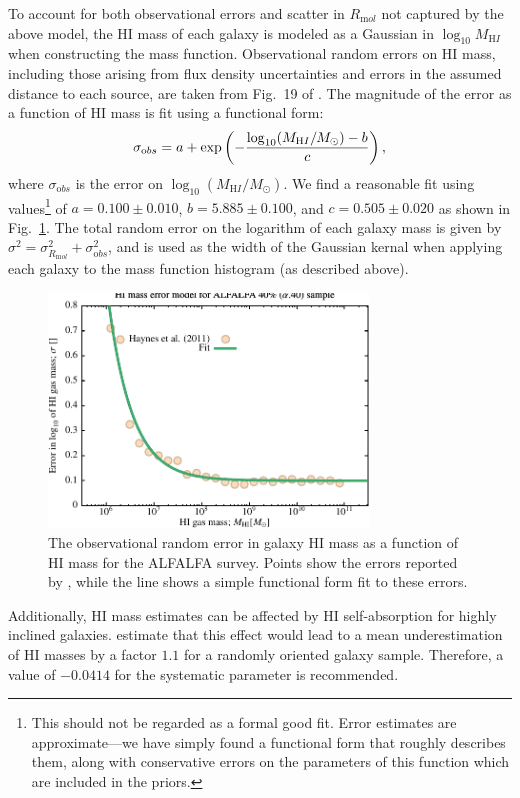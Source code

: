 To account for both observational errors and scatter in $R_{\mathrm mol}$ not captured by the above model, the HI mass of each galaxy is modeled as a Gaussian in $\log_{10}M_{\mathrm HI}$ when constructing the mass function. Observational random errors on HI mass, including those arising from flux density uncertainties and errors in the assumed distance to each source, are taken from Fig.~19 of \cite{haynes_arecibo_2011}. The magnitude of the error as a function of HI mass is fit using a functional form:
\begin{equation}
 \sigma_{\mathrm obs} = a + \exp\left(-{\log_{10}(M_{\mathrm HI}/M_\odot)-b\over c}\right),
\end{equation}
where $\sigma_{\mathrm obs}$ is the error on $\log_{10}(M_{\mathrm HI}/M_\odot)$. We find a reasonable fit using values\footnote{This should not be regarded as a formal good fit. Error estimates are approximate---we have simply found a functional form that roughly describes them, along with conservative errors on the parameters of this function which are included in the priors.} of $a=0.100 \pm 0.010$, $b=5.885 \pm 0.100$, and $c=0.505 \pm 0.020$ as shown in Fig.~\ref{fig:ALFALFAErrorModel}. The total random error on the logarithm of each galaxy mass is given by $\sigma^2 = \sigma_{R_{\mathrm mol}}^2+\sigma_{\mathrm obs}^2$, and is used as the width of the Gaussian kernal when applying each galaxy to the mass function histogram (as described above).

\begin{figure}
 \begin{center}
 \includegraphics[width=85mm,trim=0mm 0mm 0mm 4mm,clip]{Plots/DataAnalysis/alfalfaHIMassErrorModel.pdf}
 \caption{The observational random error in galaxy HI mass as a function of HI mass for the ALFALFA survey. Points show the errors reported by \protect\cite{haynes_arecibo_2011}, while the line shows a simple functional form fit to these errors.}
 \end{center}
 \label{fig:ALFALFAErrorModel}
\end{figure}

Additionally, HI mass estimates can be affected by HI self-absorption for highly inclined galaxies. \cite[][see also \protect\citealt{zwaan_hipass_2005}]{zwaan_h_1997} estimate that this effect would lead to a mean underestimation of HI masses by a factor $1.1$ for a randomly oriented galaxy sample. Therefore, a value of $-0.0414$ for the systematic parameter {\normalfont {}} is recommended.
